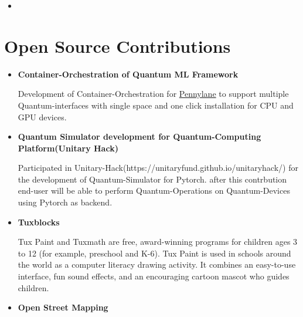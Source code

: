 \documentclass[11pt,a4paper,sans]{moderncv}        %
\begin{document}
{\begin{itemize}
\item{}

\end{itemize}

\vspace{2pt}


\section{Open Source Contributions}

\vspace{6pt}

\begin{itemize}

\item \textbf{Container-Orchestration of Quantum ML Framework}

\vspace{3pt}

Development of Container-Orchestration for \href{https://github.com/PennyLaneAI}{Pennylane} to support
multiple Quantum-interfaces with single space and one click installation for CPU and GPU devices.

\vspace{6pt}

\item \textbf{Quantum Simulator development for Quantum-Computing Platform(Unitary Hack) }
\vspace{3pt}

Participated in Unitary-Hack(https://unitaryfund.github.io/unitaryhack/) for the development of
Quantum-Simulator for Pytorch. after this contrbution end-user will be able to perform Quantum-Operations
on Quantum-Devices using Pytorch as backend.

\vspace{6pt}

\item \textbf{Tuxblocks}
\vspace{3pt}

Tux Paint and Tuxmath are free,
award-winning programs for children ages 3 to 12 (for example, preschool and K-6).
Tux Paint is used in schools around the world as a computer literacy drawing activity.
It combines an easy-to-use interface, fun sound effects,
and an encouraging cartoon mascot who guides children.

\vspace{6pt}

\item \textbf{Open Street Mapping}


\end{itemize}}
\end{document}
